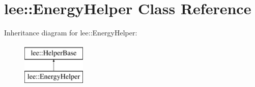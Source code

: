\hypertarget{classlee_1_1EnergyHelper}{\section{lee\-:\-:Energy\-Helper Class Reference}
\label{classlee_1_1EnergyHelper}
}
Inheritance diagram for lee\-:\-:Energy\-Helper\-:\begin{figure}[H]
\begin{center}
\leavevmode
\includegraphics[height=2.000000cm]{classlee_1_1EnergyHelper}
\end{center}
\end{figure}

